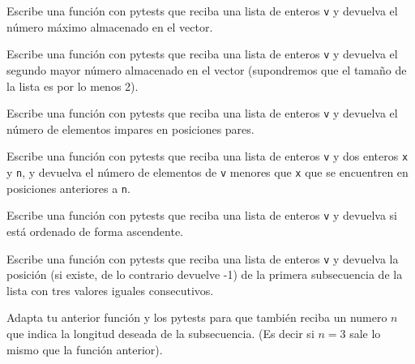 \begin{ejercicio}Escribe una función con pytests  que reciba una lista de enteros
  \verb#v# y devuelva el n\'umero m\'aximo almacenado en el vector.
\end{ejercicio}

\begin{ejercicio}Escribe una función con pytests  que reciba una lista de enteros
  \verb#v# y devuelva el segundo mayor n\'umero almacenado en
  el vector (supondremos que el tama\~no de la lista es por lo menos 2).
\end{ejercicio}
\begin{ejercicio}Escribe una función con pytests  que reciba una lista de enteros
  \verb#v# y devuelva el n\'umero de elementos impares en
  posiciones pares.
\end{ejercicio}
\begin{ejercicio}Escribe una función con pytests  que reciba una lista de enteros
  \verb#v# y dos enteros \verb#x# y \verb#n#, y devuelva el n\'umero
  de elementos de \verb#v# menores que \verb#x# que se encuentren en
  posiciones anteriores a \verb#n#.
\end{ejercicio}
\begin{ejercicio}Escribe una función con pytests  que reciba una lista de enteros
  \verb#v# y devuelva si est\'a ordenado de forma
  ascendente.
\end{ejercicio}

\begin{ejercicio}Escribe una función con pytests  que reciba una lista de enteros
  \verb#v# y devuelva la posici\'on (si existe, de lo contrario
  devuelve -1) de la primera subsecuencia de la lista con tres
  valores iguales consecutivos.
\end{ejercicio}
\begin{ejercicio}Adapta tu anterior función y los pytests  para que también reciba un numero $n$ que indica la longitud deseada de la subsecuencia. (Es decir si $n=3$ sale lo mismo que la función anterior).
\end{ejercicio}

